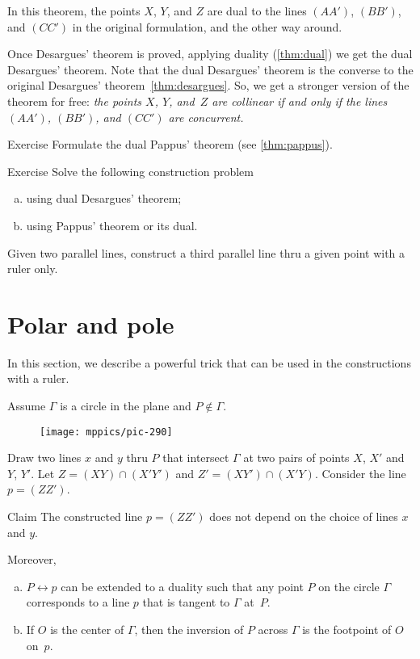 In this theorem, the points $X$, $Y$, and $Z$ 
are dual to the lines $(AA')$, $(BB')$, and $(CC')$ in the original formulation, and the other way around.

Once Desargues' theorem is proved, applying duality (\ref{thm:dual})
we get the dual Desargues' theorem.
Note that the dual Desargues' theorem is the converse to the original Desargues' theorem~\ref{thm:desargues}.
So, we get a stronger version of the theorem for free: \textit{the points $X$, $Y$, and~$Z$ are collinear {}\emph{if and only if} the lines  $(AA')$, $(BB')$, and $(CC')$ are concurrent.}

\begin{thm}{Exercise}\label{ex:dual-pappus}
Formulate the dual Pappus' theorem (see \ref{thm:pappus}).
\end{thm}

\begin{thm}{Exercise}\label{ex:dual-desargues-construction} 
Solve the following construction problem
\begin{enumerate}[(a)]
\item\label{ex:dual-desargues-construction:desargues} using dual Desargues' theorem;
\item\label{ex:dual-desargues-construction:pappus} using Pappus' theorem or its dual.
\end{enumerate}
Given two parallel lines, construct a third parallel line thru a given point with a ruler only.
\end{thm}

\section{Polar and pole}

In this section, we describe a powerful trick that can be used in the constructions with a ruler.

Assume $\Gamma$ is a circle in the plane and $P\notin \Gamma$.
\begin{figure}[!ht]
\centering
\texttt{[image: mppics/pic-290]}
\end{figure}
Draw two lines $x$ and $y$ thru $P$ that intersect $\Gamma$ at two pairs of points $X$, $X'$ and $Y$, $Y'$.
Let $Z=(XY)\cap(X'Y')$ and $Z'=(XY')\cap(X'Y)$.
Consider the line $p=(ZZ')$.

\begin{thm}{Claim}\label{clm:polar}
The constructed line $p=(ZZ')$ does not depend on the choice of lines $x$ and $y$.

Moreover, 

\begin{enumerate}[(a)]
\item $P\leftrightarrow p$ can be extended to a duality such that any point $P$ on the circle $\Gamma$ corresponds to a line $p$ that is tangent to $\Gamma$ at~$P$.
\item If $O$ is the center of $\Gamma$, then the inversion of $P$ across $\Gamma$ is the footpoint of $O$ on~$p$.
\end{enumerate}
 
\end{thm}

